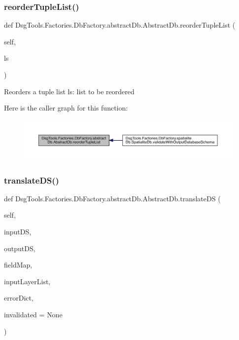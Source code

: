 \subsubsection{\texorpdfstring{reorder\+Tuple\+List()}{reorderTupleList()}}
{\footnotesize\ttfamily def Dsg\+Tools.\+Factories.\+Db\+Factory.\+abstract\+Db.\+Abstract\+Db.\+reorder\+Tuple\+List (\begin{DoxyParamCaption}\item[{}]{self,  }\item[{}]{ls }\end{DoxyParamCaption})}

\begin{DoxyVerb}Reorders a tuple list
ls: list to be reordered
\end{DoxyVerb}
 Here is the caller graph for this function\+:
\nopagebreak
\begin{figure}[H]
\begin{center}
\leavevmode
\includegraphics[width=350pt]{class_dsg_tools_1_1_factories_1_1_db_factory_1_1abstract_db_1_1_abstract_db_acd6bf5e448b6666716bcd76de48995ca_icgraph}
\end{center}
\end{figure}
\mbox{\label{class_dsg_tools_1_1_factories_1_1_db_factory_1_1abstract_db_1_1_abstract_db_a93b2e3ffcb0f8c324930af3e656cca76}} 
\subsubsection{\texorpdfstring{translate\+D\+S()}{translateDS()}}
{\footnotesize\ttfamily def Dsg\+Tools.\+Factories.\+Db\+Factory.\+abstract\+Db.\+Abstract\+Db.\+translate\+DS (\begin{DoxyParamCaption}\item[{}]{self,  }\item[{}]{input\+DS,  }\item[{}]{output\+DS,  }\item[{}]{field\+Map,  }\item[{}]{input\+Layer\+List,  }\item[{}]{error\+Dict,  }\item[{}]{invalidated = {\ttfamily None} }\end{DoxyParamCaption})}

